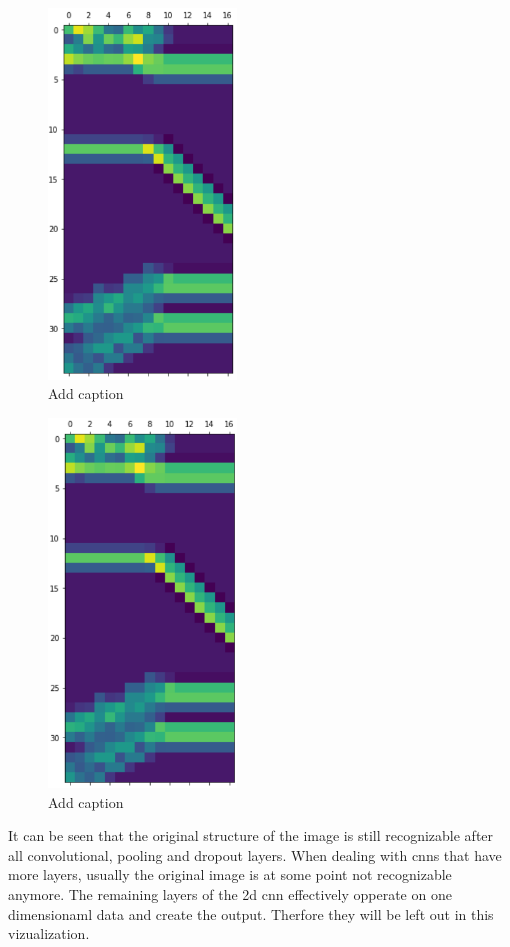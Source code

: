 \begin{minipage}{0.5\textwidth}
	\begin{figure}[H]
		\centering
		\includegraphics[width=5cm]{images/2dcnnLayer3.png}
		\caption[Bild kurz]{Add caption}
		\label{fig:vis2d3}
	\end{figure}
\end{minipage}
\begin{minipage}{0.5\textwidth}
	\begin{figure}[H]
		\centering
		\includegraphics[width=5cm]{images/2dcnnLayer4.png}
		\caption[Bild kurz]{Add caption}
		\label{fig:vis2d4}
	\end{figure}
\end{minipage}

It can be seen that the original structure of the image is still recognizable after all convolutional, pooling and dropout layers. When dealing with cnns that have more layers, usually the original image is at some point not recognizable anymore. The remaining layers of the 2d cnn effectively opperate on one dimensionaml data and create the output. Therfore they will be left out in this vizualization.


